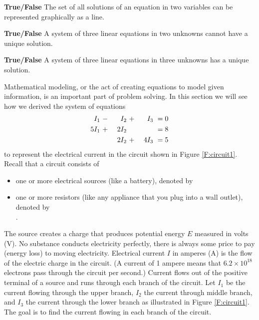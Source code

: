 	\item \textbf{True/False} The set of all solutions of an equation in two variables can be represented graphically as a line.


	\item \textbf{True/False} A system of three linear equations in two unknowns cannot have a unique solution. 


	\item \textbf{True/False} A system of three linear equations in three unknowns has a unique solution.

	\ea
\ee

 \label{sec:1_a_circuits}

Mathematical modeling, or the act of creating equations to model given information, is an important part of problem solving. In this section we will see how we derived the system of equations  
\begin{alignat}{4}
{}I_1 \	&- \	&{}I_2 \	&+ \	&{}I_3 \	&= 0  \notag \\ %
5I_1 \	&+ \	&2I_2 \		&{} \ 	&{}  \		&= 8 \notag \\ %
	\	&{} \ 	&2I_2 \		&+ \	&4I_3 \		&= 5 \notag %
\end{alignat}
to represent the electrical current in the circuit shown in Figure \ref{F:circuit1}. Recall that a circuit consists of  
\begin{itemize}
\item one or more electrical sources (like a battery), denoted by \ \ \  
\item one or more resistors (like any appliance that you plug into a wall outlet), denoted by\\
.
\end{itemize}

The source creates a charge that produces potential energy $E$ measured in volts (V). No substance conducts electricity perfectly, there is always some price to pay (energy loss) to moving electricity. Electrical current $I$ in amperes (A) is the flow of the electric charge in the circuit. (A current of 1 ampere means that $6.2 \times 10^{18}$ electrons pass through the circuit per second.) Current flows out of the positive terminal of a source and runs through each branch of the circuit. Let $I_1$ be the current flowing through the upper branch, $I_2$ the current through middle branch, and $I_3$ the current through the lower branch as illustrated in Figure \ref{F:circuit1}. The goal is to find the current flowing in each branch of the circuit.  

